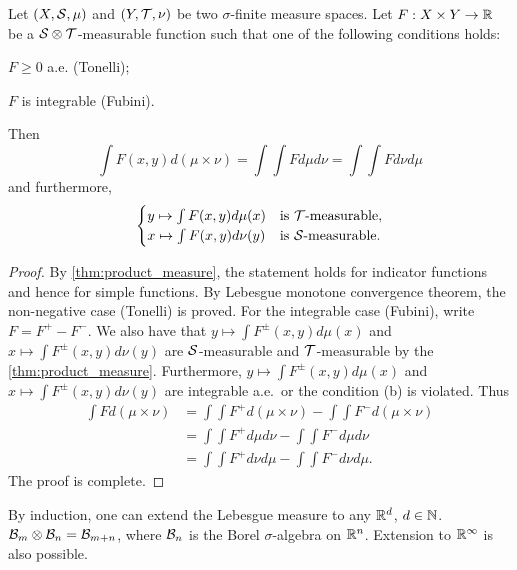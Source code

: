 \begin{theorem}
    Let $(X,\S,\mu)$ and $(Y,\T,\nu)$ be two $\sigma$-finite measure spaces. 
    Let $F:X\times Y\to\R$ be a $\S\otimes\T$-measurable function such that 
    one of the following conditions holds: 
    \begin{thmenum}
        \item $F\geq 0$ a.e. (Tonelli);
        \item $F$ is integrable (Fubini).
    \end{thmenum}
    Then 
    \begin{equation*}
        \int F(x,y)d(\mu\times\nu) = \int\int Fd\mu d\nu = \int\int Fd\nu d\mu
    \end{equation*}
    and furthermore, 
    \begin{equation*}
        \begin{cases}
            y\mapsto\int F(x,y)d\mu(x) &\text{is $\T$-measurable},\\
            x\mapsto\int F(x,y)d\nu(y) &\text{is $\S$-measurable}.
        \end{cases}
    \end{equation*}
\end{theorem}
\begin{proof}
    By \cref{thm:product_measure}, the statement holds for indicator functions
    and hence for simple functions. By Lebesgue monotone convergence theorem, 
    the non-negative case (Tonelli) is proved. For the integrable case (Fubini), 
    write $F = F^+ - F^-$. We also have that $y\mapsto\int F^\pm(x,y)d\mu(x)$ 
    and $x\mapsto\int F^\pm(x,y)d\nu(y)$ are $\S$-measurable and $\T$-measurable 
    by the \cref{thm:product_measure}. Furthermore, $y\mapsto\int F^\pm(x,y)d\mu(x)$ 
    and $x\mapsto\int F^\pm(x,y)d\nu(y)$ are integrable a.e.\ or the condition 
    (b) is violated. Thus 
    \begin{equation*}
        \begin{split}
            \int F d(\mu\times\nu) 
            &= \int\int F^+ d(\mu\times\nu) - \int\int F^- d(\mu\times\nu)\\
            &= \int\int F^+ d\mu d\nu - \int\int F^- d\mu d\nu\\
            &= \int\int F^+ d\nu d\mu - \int\int F^- d\nu d\mu.
        \end{split}
    \end{equation*}
    The proof is complete.
\end{proof}
\begin{remark}
    By induction, one can extend the Lebesgue measure to any $\R^d$, $d\in\N$. 
    $\B_m\otimes\B_n = \B_{m+n}$, where $\B_n$ is the Borel $\sigma$-algebra on $\R^n$. 
    Extension to $\R^{\infty}$ is also possible.
\end{remark}